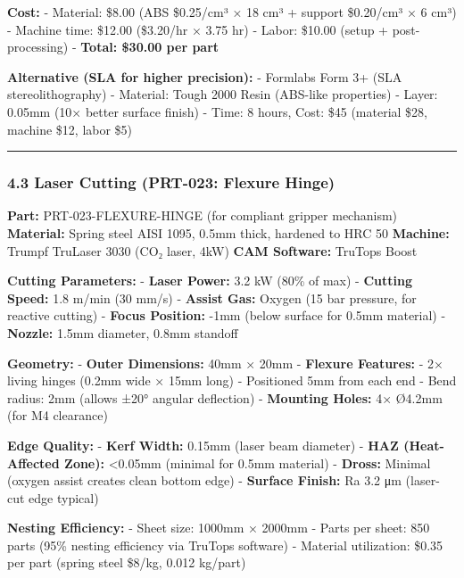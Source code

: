 \documentclass[
]{article}
\begin{document}
\textbf{Cost:} - Material: \$8.00 (ABS \$0.25/cm³ × 18 cm³ + support
\$0.20/cm³ × 6 cm³) - Machine time: \$12.00 (\$3.20/hr × 3.75 hr) -
Labor: \$10.00 (setup + post-processing) - \textbf{Total: \$30.00 per
part}

\textbf{Alternative (SLA for higher precision):} - Formlabs Form 3+ (SLA
stereolithography) - Material: Tough 2000 Resin (ABS-like properties) -
Layer: 0.05mm (10× better surface finish) - Time: 8 hours, Cost: \$45
(material \$28, machine \$12, labor \$5)

\begin{center}\rule{0.5\linewidth}{0.5pt}\end{center}

\hypertarget{laser-cutting-prt-023-flexure-hinge}{%
\subsubsection{4.3 Laser Cutting (PRT-023: Flexure
Hinge)}\label{laser-cutting-prt-023-flexure-hinge}}

\textbf{Part:} PRT-023-FLEXURE-HINGE (for compliant gripper mechanism)
\textbf{Material:} Spring steel AISI 1095, 0.5mm thick, hardened to HRC
50 \textbf{Machine:} Trumpf TruLaser 3030 (CO₂ laser, 4kW) \textbf{CAM
Software:} TruTops Boost

\textbf{Cutting Parameters:} - \textbf{Laser Power:} 3.2 kW (80\% of
max) - \textbf{Cutting Speed:} 1.8 m/min (30 mm/s) - \textbf{Assist
Gas:} Oxygen (15 bar pressure, for reactive cutting) - \textbf{Focus
Position:} -1mm (below surface for 0.5mm material) - \textbf{Nozzle:}
1.5mm diameter, 0.8mm standoff

\textbf{Geometry:} - \textbf{Outer Dimensions:} 40mm × 20mm -
\textbf{Flexure Features:} - 2× living hinges (0.2mm wide × 15mm long) -
Positioned 5mm from each end - Bend radius: 2mm (allows ±20° angular
deflection) - \textbf{Mounting Holes:} 4× Ø4.2mm (for M4 clearance)

\textbf{Edge Quality:} - \textbf{Kerf Width:} 0.15mm (laser beam
diameter) - \textbf{HAZ (Heat-Affected Zone):} \textless0.05mm (minimal
for 0.5mm material) - \textbf{Dross:} Minimal (oxygen assist creates
clean bottom edge) - \textbf{Surface Finish:} Ra 3.2 μm (laser-cut edge
typical)

\textbf{Nesting Efficiency:} - Sheet size: 1000mm × 2000mm - Parts per
sheet: 850 parts (95\% nesting efficiency via TruTops software) -
Material utilization: \$0.35 per part (spring steel \$8/kg, 0.012
kg/part)
\end{document}
